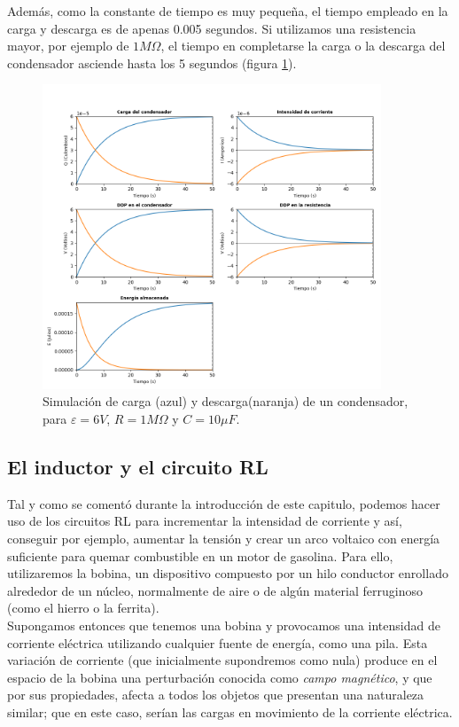 \documentclass[../main.tex]{subfiles}
\begin{document}
Además, como la constante de tiempo es muy pequeña, el tiempo empleado en la carga y descarga es de apenas 0.005 segundos. Si utilizamos una resistencia mayor, por ejemplo de $1M \Omega$, el tiempo en completarse la carga o la descarga del condensador asciende hasta los 5 segundos (figura \ref{fig::sim_ejemplo_rc2}).


\begin{figure}[h!]
    \centering
    \includegraphics[width=0.9\textwidth]{images/resultados_ejemplo_circuitoRC2.png}
    \caption{Simulación de carga (azul) y descarga(naranja) de un condensador, para $\varepsilon=6V$, $R=1M \Omega$ y $C=10 \mu F$.}
    \label{fig::sim_ejemplo_rc2}
\end{figure}

\newpage
\subsection{El inductor y el circuito RL}
Tal y como se comentó durante la introducción de este capitulo, podemos hacer uso de los circuitos RL para incrementar la intensidad de corriente y así, conseguir por ejemplo, aumentar la tensión y crear un arco voltaico con energía suficiente para quemar combustible en un motor de gasolina. Para ello, utilizaremos la bobina, un dispositivo compuesto por un hilo conductor enrollado alrededor de un núcleo, normalmente de aire o de algún material ferruginoso (como el hierro o la ferrita).\\ 

Supongamos entonces que tenemos una bobina y provocamos una intensidad de corriente eléctrica utilizando cualquier fuente de energía, como una pila. Esta variación de corriente (que inicialmente supondremos como nula) produce en el espacio de la bobina una perturbación conocida como \textit{campo magnético}, y que por sus propiedades, afecta a todos los objetos que presentan una naturaleza similar; que en este caso, serían las cargas en movimiento de la corriente eléctrica. \\
\end{document}
